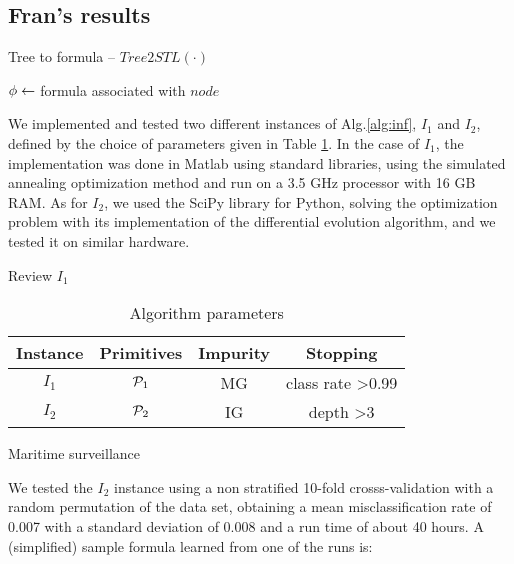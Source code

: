 \subsection{Fran's results}
\begin{algorithm}
\caption{Tree to formula -- $Tree2STL(\cdot)$}
\label{alg:tree2formula}
\DontPrintSemicolon
{}
\BlankLine


$\phi \leftarrow$ formula associated with $node$

\end{algorithm}

We implemented and tested two different instances of Alg.\ref{alg:inf}, $I_1$ and $I_2$, defined by the choice of parameters given in Table \ref{tab:inst}. In the case of $I_1$, the implementation was done in Matlab using standard libraries, using the simulated annealing optimization method and run on a 3.5 GHz processor with 16 GB RAM. As for $I_2$, we used the SciPy library for Python, solving the optimization problem with its implementation of the differential evolution algorithm, and we tested it on similar hardware.

{\color{blue} Review $I_1$}

\begin{table}
\begin{tabular}{|c|c|c|c|}
    \hline
    Instance & Primitives & Impurity & Stopping \\ \hline
    $I_1$ & $\mathcal{P}_1$ & MG & class rate >0.99 \\ \hline
    $I_2$ & $\mathcal{P}_2$ & IG & depth >3 \\ \hline
\end{tabular}
\caption{Algorithm parameters}
\label{tab:inst}
\end{table}

Maritime surveillance

We tested the $I_2$ instance using a non stratified 10-fold crosss-validation with a random permutation of the data set, obtaining a mean misclassification rate of 0.007 with a standard deviation of 0.008 and a run time of about 40 hours. A (simplified) sample formula learned from one of the runs is:

